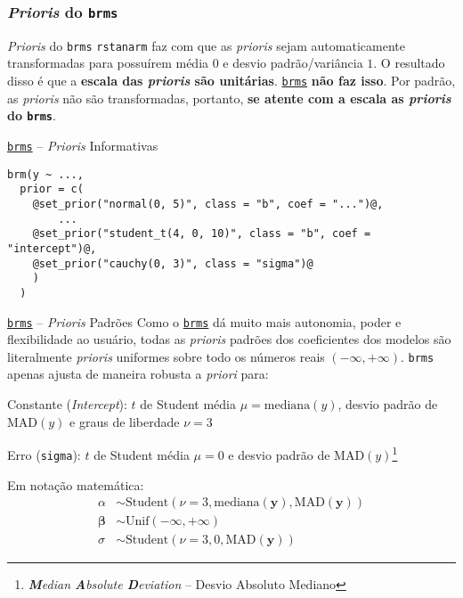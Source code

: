 \subsubsection{\textit{Prioris} do \texttt{brms}}
\begin{frame}{\textit{Prioris} do \texttt{brms}}
	\texttt{rstanarm} faz com que as \textit{prioris} sejam automaticamente
	transformadas para possuírem média $0$ e desvio padrão/variância $1$. O resultado
	disso é que a \textbf{escala das \textit{prioris} são unitárias}.
	\vfill
	\href{https://paul-buerkner.github.io/brms/}{\texttt{brms}} \textbf{não faz isso}.
	Por padrão, as \textit{prioris} não são transformadas, portanto, \textbf{se
		atente com a escala as \textit{prioris} do \texttt{brms}}.
\end{frame}

\begin{frame}[fragile]{\href{https://paul-buerkner.github.io/brms/}{\texttt{brms}} -- \textit{Prioris} Informativas}
	\begin{lstlisting}[basicstyle=\small]
brm(y ~ ...,
  prior = c(
    @set_prior("normal(0, 5)", class = "b", coef = "...")@,
        ...
    @set_prior("student_t(4, 0, 10)", class = "b", coef = "intercept")@,
    @set_prior("cauchy(0, 3)", class = "sigma")@
    )
  )
    \end{lstlisting}
\end{frame}

\begin{frame}{\href{https://paul-buerkner.github.io/brms/}{\texttt{brms}} -- \textit{Prioris} Padrões}
	Como o \href{https://paul-buerkner.github.io/brms/}{\texttt{brms}} dá
	muito mais autonomia, poder e flexibilidade ao usuário, todas as \textit{prioris}
	padrões dos coeficientes dos modelos são literalmente \textit{prioris} uniformes
	sobre todo os números reais $(-\infty, +\infty)$. \texttt{brms} apenas ajusta de
	maneira robusta a \textit{priori} para:
	\begin{vfilleditems}
		\item Constante (\textit{Intercept}): $t$ de Student média $\mu = \text{mediana}(y)$, desvio padrão de $\text{MAD}(y)$ e graus de liberdade $\nu = 3$
		\item Erro (\texttt{sigma}): $t$ de Student média $\mu = 0$ e desvio padrão de $\text{MAD}(y)$\footnote{\textit{\textbf{M}edian \textbf{A}bsolute \textbf{D}eviation} -- Desvio Absoluto Mediano}
	\end{vfilleditems}
	Em notação matemática:
	$$
		\begin{aligned}
			\alpha             & \sim \text{Student}(\nu=3, \text{mediana}({\boldsymbol{y}}), \text{MAD}({\boldsymbol{y}})) \\
			\boldsymbol{\beta} & \sim \text{Unif}(-\infty, + \infty)                                                        \\
			\sigma             & \sim \text{Student}(\nu=3, 0, \text{MAD}({\boldsymbol{y}}))
		\end{aligned}
	$$
\end{frame}
